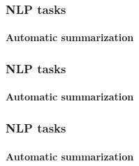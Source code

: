 \documentclass[9pt]{beamer}
\begin{document}
\begin{frame}
  \frametitle{NLP tasks}

  \framesubtitle{Automatic summarization}
\end{frame}

\begin{frame}
  \frametitle{NLP tasks}

  \framesubtitle{Automatic summarization}
\end{frame}

\begin{frame}
  \frametitle{NLP tasks}

  \framesubtitle{Automatic summarization}
\end{frame}
\end{document}
